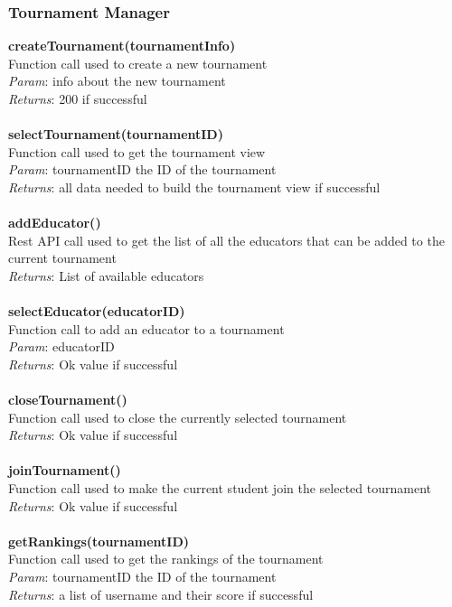 \documentclass{article}
\begin{document}
\subsubsection{Tournament Manager}
\textbf{createTournament(tournamentInfo)}\\
Function call used to create a new tournament\\
\textit{Param}: info about the new tournament\\
\textit{Returns}: 200 if successful\\
\\
\textbf{selectTournament(tournamentID)}\\
Function call used to get the  tournament view\\
\textit{Param}: tournamentID the ID of the tournament\\
\textit{Returns}: all data needed to build the tournament view if successful\\
\\
\textbf{addEducator()}\\
Rest API call used to get the list of all the educators that can be added to the current tournament\\
\textit{Returns}: List of available educators\\
\\
\textbf{selectEducator(educatorID)}\\
Function call to add an educator to a tournament\\
\textit{Param}: educatorID\\
\textit{Returns}: Ok value if successful\\
\\
\textbf{closeTournament()}\\
Function call used to close the currently selected tournament\\
\textit{Returns}: Ok value if successful\\
\\
\textbf{joinTournament()}\\
Function call used to make the current student join the selected tournament\\
\textit{Returns}: Ok value if successful\\
\\
\textbf{getRankings(tournamentID)}\\
Function call used to get the rankings of the tournament\\
\textit{Param}: tournamentID the ID of the tournament\\
\textit{Returns}: a list of username and their score if successful\\
\end{document}
